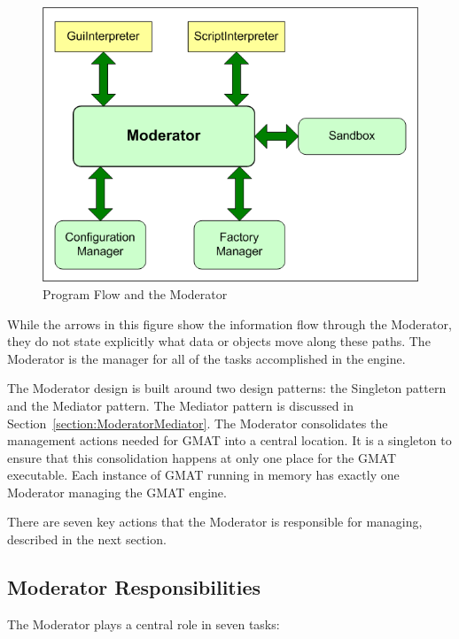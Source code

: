 \begin{figure}[htb]
\begin{center}
\includegraphics[239,175]{Images/ModeratorInteractions.png}
\caption{Program Flow and the Moderator}
\label{figure:ModeratorInteractions}
\end{center}
\end{figure}

While the arrows in this figure show the information flow through the Moderator, they do not state
explicitly what data or objects move along these paths.  The Moderator is the manager for all of
the tasks accomplished in the engine.

The Moderator design is built around two design patterns: the Singleton pattern and the Mediator
pattern.  The Mediator pattern is discussed in Section~\ref{section:ModeratorMediator}.  The
Moderator consolidates the management actions needed for GMAT into a central location.  It is a
singleton to ensure that this consolidation happens at only one place for the GMAT executable.  Each
instance of GMAT running in memory has exactly one Moderator managing the GMAT engine.

There are seven key actions that the Moderator is responsible for managing, described in the next
section.

\subsection{Moderator Responsibilities}

The Moderator plays a central role in seven tasks:


